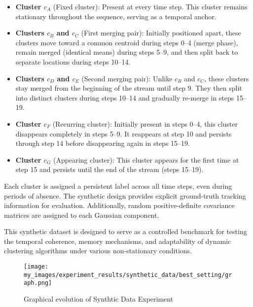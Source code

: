 \begin{itemize}
      \item \textbf{Cluster $ c_A $} (Fixed cluster): Present at every time step.
            This cluster remains stationary throughout the sequence, serving as a
            temporal anchor.

      \item \textbf{Clusters $ c_B $ and $ c_C $} (First merging pair): Initially
            positioned apart, these clusters move toward a common centroid during steps 0--4
            (merge phase), remain merged (identical means) during steps 5--9, and then split
            back to separate locations during steps 10--14.

      \item \textbf{Clusters $ c_D $ and $ c_E $} (Second merging pair): Unlike $ c_B $
            and $ c_C $, these clusters stay merged from the beginning of the stream until
            step 9. They then split into distinct clusters during steps 10--14 and gradually
            re-merge in steps 15--19.

      \item \textbf{Cluster $ c_F $} (Recurring cluster): Initially present in steps 0--4,
            this cluster disappears completely in steps 5--9. It reappears at step 10 and
            persists through step 14 before disappearing again in steps 15--19.

      \item \textbf{Cluster $ c_G $} (Appearing cluster): This cluster appears for
            the first time at step 15 and persists until the end of the stream (steps 15--19).
\end{itemize}

Each cluster is assigned a persistent label across all time steps, even during
periods of absence. The synthetic design provides explicit ground-truth
tracking information for evaluation. Additionally, random positive-definite
covariance matrices are assigned to each Gaussian component.

This synthetic dataset is designed to serve as a controlled benchmark for
testing the temporal coherence, memory mechanisms, and adaptability of dynamic
clustering algorithms under various non-stationary conditions.
\begin{figure}[h]
      \centering
      \texttt{[image: my\_images/experiment\_results/synthetic\_data/best\_setting/graph.png]}
      \caption{Graphical evolution of Synthtic Data Experiment}
\end{figure}


